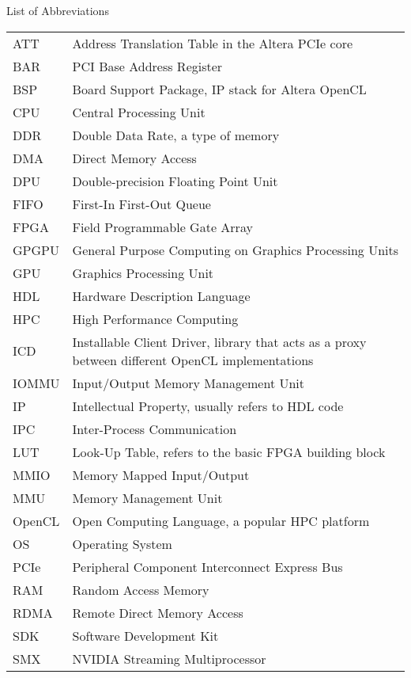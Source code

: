 \clearemptydoublepage

{}

\begin{center}
	\huge{List of Abbreviations}
\end{center}


\vspace{3cm}


\begin{center}
\begin{tabular}{l p{12cm}}
	ATT & Address Translation Table in the Altera PCIe core\\
	BAR & PCI Base Address Register\\
	BSP & Board Support Package, IP stack for Altera OpenCL\\
	CPU & Central Processing Unit\\
	DDR & Double Data Rate, a type of memory\\
	DMA & Direct Memory Access\\
	DPU & Double-precision Floating Point Unit\\
	FIFO & First-In First-Out Queue\\
	FPGA & Field Programmable Gate Array\\
	GPGPU & General Purpose Computing on Graphics Processing Units\\
	GPU & Graphics Processing Unit\\
	HDL & Hardware Description Language\\
	HPC & High Performance Computing\\
	ICD & Installable Client Driver, library that acts as a proxy between different OpenCL implementations\\
	IOMMU & Input/Output Memory Management Unit\\
	IP  & Intellectual Property, usually refers to HDL code\\
	IPC & Inter-Process Communication\\
	LUT & Look-Up Table, refers to the basic FPGA building block\\
	MMIO & Memory Mapped Input/Output\\
	MMU & Memory Management Unit\\
	OpenCL & Open Computing Language, a popular HPC platform\\
	OS  & Operating System\\
	PCIe & Peripheral Component Interconnect Express Bus\\
	RAM & Random Access Memory\\
	RDMA & Remote Direct Memory Access\\
	SDK & Software Development Kit\\
	SMX & NVIDIA Streaming Multiprocessor\\
	
\end{tabular}
\end{center}
